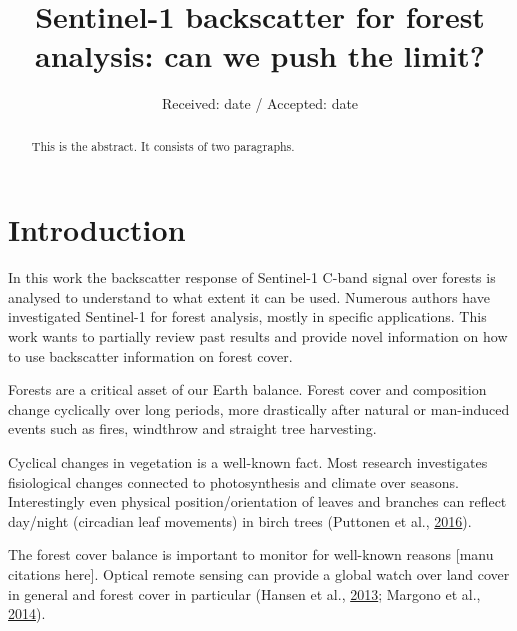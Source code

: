 \documentclass[smallextended]{svjour3}       %
\begin{document}
\title{Sentinel-1 backscatter for forest analysis: can we push the limit? }



\author{  }


\institute{
    }

\date{Received: date / Accepted: date}


\maketitle

\begin{abstract}
This is the abstract. It consists of two paragraphs.
\\
\keywords{
    }


\end{abstract}


\def\spacingset#1{\renewcommand{\baselinestretch}%
{#1}\small\normalsize} \spacingset{1}


\hypertarget{introduction}{%
\section{Introduction}\label{introduction}}

In this work the backscatter response of Sentinel-1 C-band signal over
forests is analysed to understand to what extent it can be used.
Numerous authors have investigated Sentinel-1 for forest analysis,
mostly in specific applications. This work wants to partially review
past results and provide novel information on how to use backscatter
information on forest cover.

Forests are a critical asset of our Earth balance. Forest cover and
composition change cyclically over long periods, more drastically after
natural or man-induced events such as fires, windthrow and straight tree
harvesting.

Cyclical changes in vegetation is a well-known fact. Most research
investigates fisiological changes connected to photosynthesis and
climate over seasons. Interestingly even physical position/orientation
of leaves and branches can reflect day/night (circadian leaf movements)
in birch trees (Puttonen et al.,
\protect\hyperlink{ref-Puttonen2016}{2016}).

The forest cover balance is important to monitor for well-known reasons
{[}manu citations here{]}. Optical remote sensing can provide a global
watch over land cover in general and forest cover in particular (Hansen
et al., \protect\hyperlink{ref-Hansen2013}{2013}; Margono et al.,
\protect\hyperlink{ref-Margono2014}{2014}).
\end{document}
